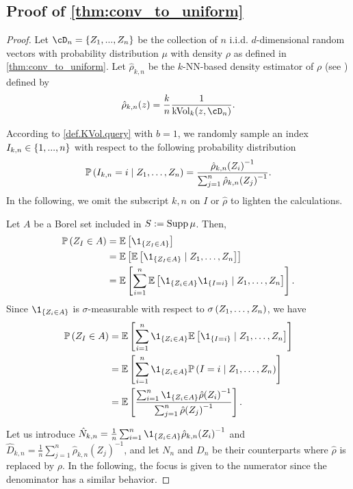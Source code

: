 \documentclass[twoside]{article}
\DeclareMathOperator{\kvol}{kVol}
\theoremstyle{definition}
\theoremstyle{remark}
\newcommand{\kvv}{z} %
\newcommand{\KVV}{Z} %
\begin{document}
\subsection{Proof of \cref{thm:conv_to_uniform}}
\label{app:proof_of_conv_to_uniform}

\begin{proof}
%
Let $\cD_n = \set{Z_1,...,Z_n}$ be the collection of $n$ i.i.d. $d$-dimensional random vectors with probability distribution $\mu$ with density $\rho$ as defined in \cref{thm:conv_to_uniform}. 
Let $\hat{\rho}_{k,n}$ be the $k$-NN-based density estimator of $\rho$ (see \citet{biauLecturesNearestNeighbor2015}) defined by
\[
				\hat{\rho}_{k,n}(\kvv) = \frac{k}{n} \frac{1}{\kvol_k(\kvv,\cD_n)} \\
.\]

According to \cref{def.KVol.query} with $b=1$, we randomly sample an index $I_{k,n}\in \left\{1,...,n\right\}$ with respect to the following probability distribution
\[
				\P\pa{I_{k,n}=i\mid \KVV_1,\ldots,\KVV_n} = \frac{{\hat{\rho}_{k,n}(\KVV_i)}^{-1}}{\sum_{j=1}^n {\hat{\rho}_{k,n}(\KVV_j)}^{-1}}
.\] 
%
In the following, we omit the subscript $k,n$ on $I$ or $\hat{\rho}$ to lighten the calculations.


Let $A$ be a Borel set included in $S := \operatorname{Supp} \mu$. Then, 
\begin{align*}
\P\pa{\KVV_I \in A} &= \E\bra{\1_{\set{\KVV_I\in A}}} \\
                 &= \E\bra{\E\bra{\1_{\set{\KVV_I\in A}} \mid \KVV_1,\ldots,\KVV_n}} \\
                 &= \E\bra{\sum_{i=1}^n\E\bra{\1_{\set{\KVV_i\in A}}\1_{\set{I = i}} \mid \KVV_1,\ldots,\KVV_n}} .
\end{align*}                                                 
%
Since $ \1_{\set{\KVV_i \in A}}$ is $\sigma$-measurable with respect to $\sigma\pa{\KVV_1,\ldots,\KVV_n}$, we have
\begin{align*}
\P\pa{\KVV_I \in A}				 &= \E\bra{\sum_{i=1}^n\1_{\set{\KVV_i\in A}}\E\bra{\1_{\set{I = i}} \mid \KVV_1,\ldots,\KVV_n}} \\
     &= \E\bra{\sum_{i=1}^n\1_{\set{\KVV_i\in A}}\P\pa{I = i \mid \KVV_1,\ldots,\KVV_n}} \\
     &= \E\bra{\frac{\sum_{i=1}^n\1_{\set{\KVV_i\in A}}{\hat{\rho}(\KVV_i)}^{-1}}{\sum_{j=1}^n {\hat{\rho}(\KVV_j)}^{-1}}} .
 \end{align*}

Let us introduce $\hat{N}_{k,n} = \frac{1}{n} \sum_{i=1}^n\1_{\set{\KVV_i\in A}}{\hat{\rho}_{k,n}(\KVV_i)}^{-1}$ and $\hat{D}_{k,n} = \frac{1}{n}\sum_{j=1}^n {\hat{\rho}_{k,n}(\KVV_j)}^{-1}$, and let $N_n$ and $D_n$ be their counterparts where $\hat{\rho}$ is replaced by $\rho$.
%
In the following, the focus is given to the numerator since the denominator has a similar behavior.


\end{proof}
\end{document}
